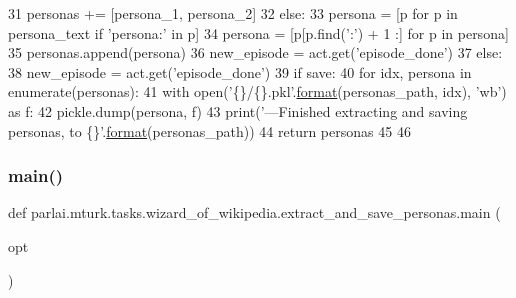 \begin{DoxyCode}
31                 personas += [persona\_1, persona\_2]
32             \textcolor{keywordflow}{else}:
33                 persona = [p \textcolor{keywordflow}{for} p \textcolor{keywordflow}{in} persona\_text \textcolor{keywordflow}{if} \textcolor{stringliteral}{'persona:'} \textcolor{keywordflow}{in} p]
34                 persona = [p[p.find(\textcolor{stringliteral}{':'}) + 1 :] \textcolor{keywordflow}{for} p \textcolor{keywordflow}{in} persona]
35                 personas.append(persona)
36             new\_episode = act.get(\textcolor{stringliteral}{'episode\_done'})
37         \textcolor{keywordflow}{else}:
38             new\_episode = act.get(\textcolor{stringliteral}{'episode\_done'})
39     \textcolor{keywordflow}{if} save:
40         \textcolor{keywordflow}{for} idx, persona \textcolor{keywordflow}{in} enumerate(personas):
41             with open(\textcolor{stringliteral}{'\{\}/\{\}.pkl'}.\hyperlink{namespaceparlai_1_1chat__service_1_1services_1_1messenger_1_1shared__utils_a32e2e2022b824fbaf80c747160b52a76}{format}(personas\_path, idx), \textcolor{stringliteral}{'wb'}) \textcolor{keyword}{as} f:
42                 pickle.dump(persona, f)
43         print(\textcolor{stringliteral}{'---Finished extracting and saving personas, to \{\}'}.\hyperlink{namespaceparlai_1_1chat__service_1_1services_1_1messenger_1_1shared__utils_a32e2e2022b824fbaf80c747160b52a76}{format}(personas\_path))
44     \textcolor{keywordflow}{return} personas
45 
46 
\end{DoxyCode}
\mbox{\label{namespaceparlai_1_1mturk_1_1tasks_1_1wizard__of__wikipedia_1_1extract__and__save__personas_a8760b04b46dbe7ee79bd15ae3b20761c}} 
\subsubsection{\texorpdfstring{main()}{main()}}
{\footnotesize\ttfamily def parlai.\+mturk.\+tasks.\+wizard\+\_\+of\+\_\+wikipedia.\+extract\+\_\+and\+\_\+save\+\_\+personas.\+main (\begin{DoxyParamCaption}\item[{}]{opt }\end{DoxyParamCaption})}



